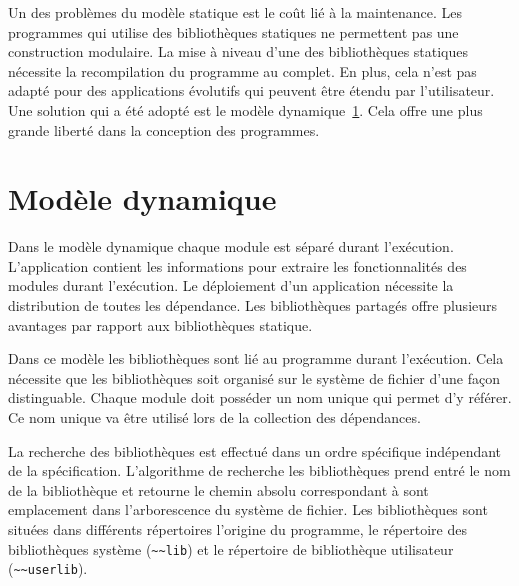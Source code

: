 
Un des problèmes du modèle statique est le coût lié à la maintenance.  Les
programmes qui utilise des bibliothèques statiques ne permettent pas une
construction modulaire. La mise à niveau d'une des bibliothèques statiques
nécessite la recompilation du programme au complet. En plus, cela n'est pas
adapté pour des applications évolutifs qui peuvent être étendu
par l'utilisateur. Une solution qui a été adopté est le
modèle dynamique~\ref{sec:ch4_model_dynamic}. Cela offre une plus grande
liberté dans la conception des programmes.


\section{Modèle dynamique}
\label{sec:ch4_model_dynamic}

Dans le modèle dynamique chaque module est séparé durant l'exécution.
L'application contient les informations pour extraire les fonctionnalités des
modules durant l'exécution. Le déploiement d'un application nécessite la
distribution de toutes les dépendance.  Les bibliothèques partagés offre
plusieurs avantages par rapport aux bibliothèques statique.

Dans ce modèle les bibliothèques sont lié au programme durant l'exécution. Cela
nécessite que les bibliothèques soit organisé sur le système de fichier d'une façon
distinguable. Chaque module doit posséder un nom unique qui permet d'y référer.
Ce nom unique va être utilisé lors de la collection des dépendances.




La recherche des bibliothèques est effectué dans un ordre spécifique
indépendant de la spécification.  L'algorithme de recherche les bibliothèques
prend entré le nom de la bibliothèque et retourne le chemin absolu
correspondant à sont emplacement dans l'arborescence du système de fichier. Les
bibliothèques sont situées dans différents répertoires l'origine du programme,
le répertoire des bibliothèques système (\lstinline{~~lib}) et le
répertoire de bibliothèque utilisateur (\lstinline{~~userlib}).


